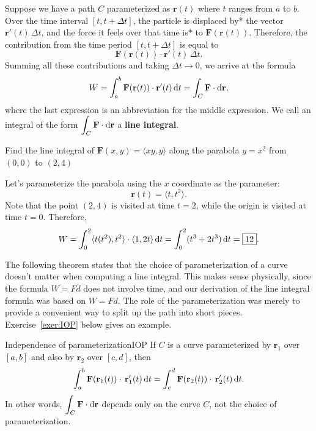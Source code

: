 \documentclass{watsonbook}
\begin{document}
Suppose we have a path $C$ parameterized as $\mathbf{r}(t)$ where $t$
ranges from $a$ to $b$. Over the time interval $[t,t+\Delta t]$, the
particle is displaced by* the vector $\mathbf{r}'(t) \, \Delta t$, and
the force it feels over that time is* to $\mathbf{F}(\mathbf{r}(t))$.
Therefore, the contribution from the time period $[t, t+\Delta t]$ is
equal to 
\[
  \mathbf{F}(\mathbf{r}(t)) \cdot \mathbf{r}'(t) \, \Delta t. 
\]
Summing all these contributions and taking $\Delta t \to 0$, we arrive
at the formula
\[
  W = \int_a^b \mathbf{F}(\mathbf{r}(t)) \cdot \mathbf{r}'(t) \, {\mathrm{d}}t =
  \int_C \mathbf{F} \cdot \mathrm{d}\mathbf{r}, 
\]
where the last expression is an abbreviation for the middle
expression. We call an integral of the form $\displaystyle{\int_C \mathbf{F} \cdot
\mathrm{d}\mathbf{r}}$ a \textbf{line integral}. 

\begin{example}{}{}
  Find the line integral of $\mathbf{F}(x,y) = \langle xy, y \rangle$
  along the parabola $y = x^2$ from 
  $(0,0)$ to $(2,4)$
\end{example}

\begin{solution}
  Let's parameterize the parabola using the $x$ coordinate as the
  parameter:
  \[
    \mathbf{r}(t) = \langle t, t^2 \rangle. 
  \]
  Note that the point $(2,4)$ is visited at time $t=2$, while the
  origin is visited at time $t=0$. Therefore, 
  \[
    W = \int_0^2 \langle t(t^2), t^2 \rangle \cdot \langle 1, 2t \rangle
    \, {\mathrm{d}}t = \int_0^2 (t^3 + 2t^3) \, {\mathrm{d}}t = \boxed{12}. 
  \]
\end{solution}

The following theorem states that the choice of parameterization of a
curve doesn't matter when computing a line integral. This makes sense
physically, since the formula $W = Fd$ does not involve time, and our
derivation of the line integral formula was based on $W=Fd$. The role
of the parameterization was merely to provide a convenient way to split
up the path into short pieces. Exercise~\ref{exer:IOP} below gives an
example.

\begin{theo}{Independence of parameterization}{IOP}
  If $C$ is a curve parameterized by $\mathbf{r}_1$ over $[a,b]$ and
  also by $\mathbf{r}_2$ over $[c,d]$, then
  \[
    \int_a^b\mathbf{F}(\mathbf{r}_1(t))  \cdot \,
    \mathbf{r}'_1(t) \, {\mathrm{d}}t =
    \int_c^d \mathbf{F}(\mathbf{r}_2(t))  \cdot \,
    \mathbf{r}'_2(t) \, {\mathrm{d}}t. 
  \]
  In other words, $\displaystyle{\int_C \mathbf{F} \cdot \mathrm{d}\mathbf{r}}$ depends only
  on the curve $C$, not the choice of parameterization. 
\end{theo}
\end{document}
